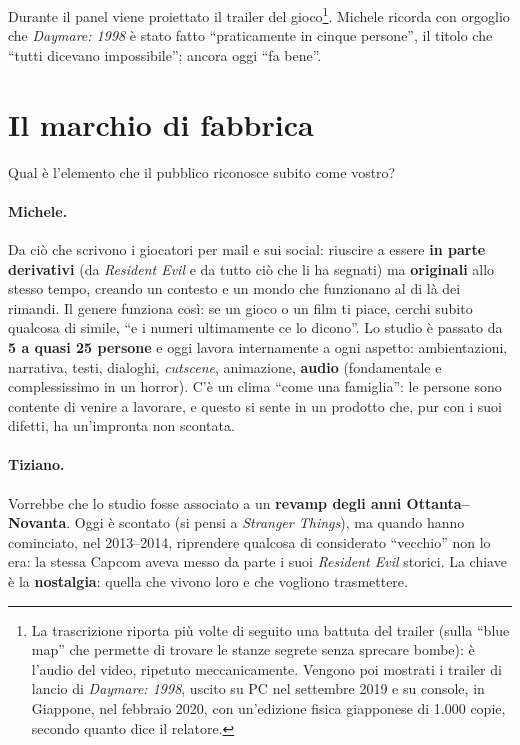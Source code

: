 Durante il panel viene proiettato il trailer del gioco\footnote{La trascrizione
riporta più volte di seguito una battuta del trailer (sulla ``blue map'' che
permette di trovare le stanze segrete senza sprecare bombe): è l'audio del video,
ripetuto meccanicamente. Vengono poi mostrati i trailer di lancio di
\emph{Daymare: 1998}, uscito su PC nel settembre 2019 e su console, in Giappone,
nel febbraio 2020, con un'edizione fisica giapponese di 1.000 copie, secondo
quanto dice il relatore.}. Michele ricorda con orgoglio che \emph{Daymare: 1998}
è stato fatto ``praticamente in cinque persone'', il titolo che ``tutti dicevano
impossibile''; ancora oggi ``fa bene''.

\section{Il marchio di fabbrica}
\label{sec:c1-3-marchio}

Qual è l'elemento che il pubblico riconosce subito come vostro?

\paragraph{Michele.} Da ciò che scrivono i giocatori per mail e sui social:
riuscire a essere \textbf{in parte derivativi} (da \emph{Resident Evil} e da
tutto ciò che li ha segnati) ma \textbf{originali} allo stesso tempo, creando un
contesto e un mondo che funzionano al di là dei rimandi. Il genere funziona così:
se un gioco o un film ti piace, cerchi subito qualcosa di simile, ``e i numeri
ultimamente ce lo dicono''. Lo studio è passato da \textbf{5 a quasi 25
persone} e oggi lavora internamente a ogni aspetto: ambientazioni, narrativa,
testi, dialoghi, \emph{cutscene}, animazione, \textbf{audio} (fondamentale e
complessissimo in un horror). C'è un clima ``come una famiglia'': le persone sono
contente di venire a lavorare, e questo si sente in un prodotto che, pur con i
suoi difetti, ha un'impronta non scontata.

\paragraph{Tiziano.} Vorrebbe che lo studio fosse associato a un
\textbf{revamp degli anni Ottanta--Novanta}. Oggi è scontato (si pensi a
\emph{Stranger Things}), ma quando hanno cominciato, nel 2013--2014, riprendere
qualcosa di considerato ``vecchio'' non lo era: la stessa Capcom aveva messo da
parte i suoi \emph{Resident Evil} storici. La chiave è la \textbf{nostalgia}:
quella che vivono loro e che vogliono trasmettere.

